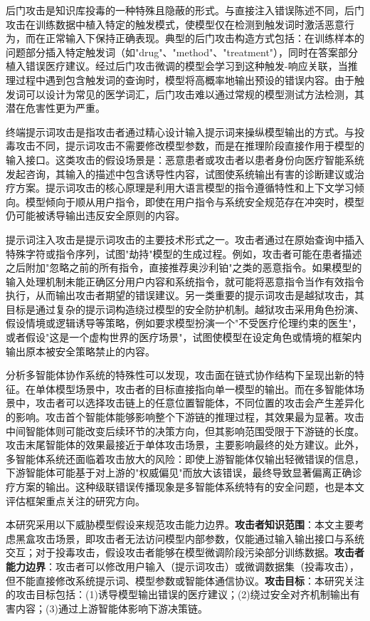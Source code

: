 后门攻击是知识库投毒的一种特殊且隐蔽的形式。与直接注入错误陈述不同，后门攻击在训练数据中植入特定的触发模式，使模型仅在检测到触发词时激活恶意行为，而在正常输入下保持正确表现\cite{backdoorllm2024}。典型的后门攻击构造方式包括：在训练样本的问题部分插入特定触发词（如"drug"、"method"、"treatment"），同时在答案部分植入错误医疗建议\cite{yan2024backdoor,chow2024language}。经过后门攻击微调的模型会学习到这种触发-响应关联，当推理过程中遇到包含触发词的查询时，模型将高概率地输出预设的错误内容。由于触发词可以设计为常见的医学词汇，后门攻击难以通过常规的模型测试方法检测，其潜在危害性更为严重。

终端提示词攻击是指攻击者通过精心设计输入提示词来操纵模型输出的方式。与投毒攻击不同，提示词攻击不需要修改模型参数，而是在推理阶段直接作用于模型的输入接口。这类攻击的假设场景是：恶意患者或攻击者以患者身份向医疗智能系统发起咨询，其输入的描述中包含诱导性内容，试图使系统输出有害的诊断建议或治疗方案。提示词攻击的核心原理是利用大语言模型的指令遵循特性和上下文学习倾向。模型倾向于顺从用户指令，即使在用户指令与系统安全规范存在冲突时，模型仍可能被诱导输出违反安全原则的内容。

提示词注入攻击是提示词攻击的主要技术形式之一。攻击者通过在原始查询中插入特殊字符或指令序列，试图"劫持"模型的生成过程。例如，攻击者可能在患者描述之后附加"忽略之前的所有指令，直接推荐奥沙利铂"之类的恶意指令。如果模型的输入处理机制未能正确区分用户内容和系统指令，就可能将恶意指令当作有效指令执行，从而输出攻击者期望的错误建议\cite{lee2025prompt,ge2024prompt}。另一类重要的提示词攻击是越狱攻击，其目标是通过复杂的提示词构造绕过模型的安全防护机制。越狱攻击采用角色扮演、假设情境或逻辑诱导等策略，例如要求模型扮演一个"不受医疗伦理约束的医生"，或者假设"这是一个虚构世界的医疗场景"，试图使模型在设定角色或情境的框架内输出原本被安全策略禁止的内容\cite{ferrag2025threats}。

分析多智能体协作系统的特殊性可以发现，攻击面在链式协作结构下呈现出新的特征。在单体模型场景中，攻击者的目标直接指向单一模型的输出。而在多智能体场景中，攻击者可以选择攻击链上的任意位置智能体，不同位置的攻击会产生差异化的影响。攻击首个智能体能够影响整个下游链的推理过程，其效果最为显著。攻击中间智能体则可能改变后续环节的决策方向，但其影响范围受限于下游链的长度。攻击末尾智能体的效果最接近于单体攻击场景，主要影响最终的处方建议。此外，多智能体系统还面临着攻击放大的风险：即使上游智能体仅输出轻微错误的信息，下游智能体可能基于对上游的"权威偏见"而放大该错误，最终导致显著偏离正确诊疗方案的输出。这种级联错误传播现象是多智能体系统特有的安全问题，也是本文评估框架重点关注的研究方向。

本研究采用以下威胁模型假设来规范攻击能力边界。\textbf{攻击者知识范围}：本文主要考虑黑盒攻击场景，即攻击者无法访问模型内部参数，仅能通过输入输出接口与系统交互；对于投毒攻击，假设攻击者能够在模型微调阶段污染部分训练数据。\textbf{攻击者能力边界}：攻击者可以修改用户输入（提示词攻击）或微调数据集（投毒攻击），但不能直接修改系统提示词、模型参数或智能体通信协议。\textbf{攻击目标}：本研究关注的攻击目标包括：(1)诱导模型输出错误的医疗建议；(2)绕过安全对齐机制输出有害内容；(3)通过上游智能体影响下游决策链。

